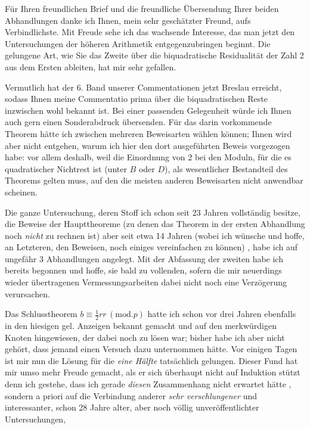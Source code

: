 \clearpage{}
Für Ihren freundlichen Brief und die freundliche Übersendung Ihrer beiden Abhandlungen danke ich Ihnen, mein sehr geschätzter Freund, aufs Verbindlichste. Mit Freude sehe ich das wachsende Interesse, das man jetzt den Untersuchungen der höheren Arithmetik entgegenzubringen beginnt. Die gelungene Art, wie Sie das Zweite über die biquadratische Residualität der Zahl 2 aus dem Ersten ableiten, hat mir sehr gefallen.
\par Vermutlich hat der 6. Band unserer Commentationen jetzt Breslau erreicht, sodass Ihnen meine Commentatio prima über die biquadratischen Reste inzwischen wohl bekannt ist. Bei einer passenden Gelegenheit würde ich Ihnen auch gern einen Sonderabdruck übersenden. Für das darin vorkommende Theorem hätte ich zwischen mehreren Beweisarten wählen können; Ihnen wird aber nicht entgehen, warum ich hier den dort ausgeführten Beweis vorgezogen habe: vor allem deshalb, weil die Einordnung von 2 bei den Moduln, für die es quadratischer Nichtrest ist (unter $B$ oder $D$), als wesentlicher Bestandteil des Theorems gelten muss, auf den die meisten anderen Beweisarten nicht anwendbar scheinen.
\par Die ganze Untersuchung, deren Stoff ich schon seit 23 Jahren vollständig besitze, die Beweise der Haupttheoreme (zu denen das Theorem in der ersten Abhandlung noch \textit{nicht} zu rechnen ist) aber seit etwa 14 Jahren \textemdash{} (wobei ich wünsche und hoffe, an Letzteren, den Beweisen, noch einiges vereinfachen zu können) \textemdash{}, habe ich auf ungefähr 3 Abhandlungen angelegt. Mit der Abfassung der zweiten habe ich bereits begonnen und hoffe, sie bald zu vollenden, sofern die mir neuerdings wieder übertragenen Vermessungsarbeiten dabei nicht noch eine Verzögerung verursachen.
\par Das Schlusstheorem $b\equiv\frac12rr\, (\mathrm{mod}.p)$ hatte ich schon vor drei Jahren ebenfalls in den hiesigen gel. Anzeigen bekannt gemacht und auf den merkwürdigen Knoten hingewiesen, der dabei noch zu lösen war; bisher habe ich aber nicht gehört, dass jemand einen Versuch dazu unternommen hätte. Vor einigen Tagen ist mir nun die Lösung für die \textit{eine Hälfte} tatsächlich gelungen. Dieser Fund hat mir umso mehr Freude gemacht, als er sich überhaupt nicht auf Induktion stützt \textemdash{} denn ich gestehe, dass ich gerade \textit{diesen} Zusammenhang nicht erwartet hätte \textemdash{}, sondern a priori auf die Verbindung anderer \textit{sehr verschlungener} und interessanter, schon 28 Jahre alter, aber noch völlig unveröffentlichter Untersuchungen,
